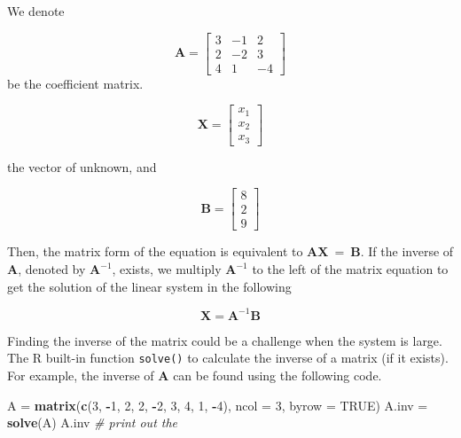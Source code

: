 \documentclass[
]{book}
\newenvironment{Shaded}{\begin{snugshade}}{\end{snugshade}}
\newcommand{\AttributeTok}[1]{\textcolor[rgb]{0.13,0.29,0.53}{#1}}
\newcommand{\CommentTok}[1]{\textcolor[rgb]{0.56,0.35,0.01}{\textit{#1}}}
\newcommand{\ConstantTok}[1]{\textcolor[rgb]{0.56,0.35,0.01}{#1}}
\newcommand{\DecValTok}[1]{\textcolor[rgb]{0.00,0.00,0.81}{#1}}
\newcommand{\FunctionTok}[1]{\textcolor[rgb]{0.13,0.29,0.53}{\textbf{#1}}}
\newcommand{\NormalTok}[1]{#1}
\newcommand{\OtherTok}[1]{\textcolor[rgb]{0.56,0.35,0.01}{#1}}
\newcommand{\SpecialCharTok}[1]{\textcolor[rgb]{0.81,0.36,0.00}{\textbf{#1}}}
\begin{document}
We denote

\[
\mathbf{A} = \left[
\begin{array}{ccc}
 3 & -1 &  2 \\ 
 2 & -2 &  3 \\ 
 4 &  1 & -4 
\end{array}
\right]
\]
be the coefficient matrix.

\[
\mathbf{X} = \left[ \begin{array}{c} x_1 \\ x_2 \\ x_3  \end{array} \right]
\]

the vector of unknown, and

\[
\mathbf{B} = \left[ \begin{array}{c} 8 \\ 2 \\ 9  \end{array} \right]
\]

Then, the matrix form of the equation is equivalent to \(\mathbf{A}\mathbf{X} ~=~ \mathbf{B}\). If the inverse of \(\mathbf{A}\), denoted by \(\mathbf{A}^{-1}\), exists, we multiply \(\mathbf{A}^{-1}\) to the left of the matrix equation to get the solution of the linear system in the following

\[
\mathbf{X} = \mathbf{A}^{-1}\mathbf{B}
\]

Finding the inverse of the matrix could be a challenge when the system is large. The R built-in function \texttt{solve()} to calculate the inverse of a matrix (if it exists).
For example, the inverse of \(\mathbf{A}\) can be found using the following code.

\begin{Shaded}
\begin{Highlighting}[]
\NormalTok{A }\OtherTok{=} \FunctionTok{matrix}\NormalTok{(}\FunctionTok{c}\NormalTok{(}\DecValTok{3}\NormalTok{, }\SpecialCharTok{{-}}\DecValTok{1}\NormalTok{, }\DecValTok{2}\NormalTok{, }\DecValTok{2}\NormalTok{, }\SpecialCharTok{{-}}\DecValTok{2}\NormalTok{, }\DecValTok{3}\NormalTok{, }\DecValTok{4}\NormalTok{, }\DecValTok{1}\NormalTok{, }\SpecialCharTok{{-}}\DecValTok{4}\NormalTok{), }\AttributeTok{ncol =} \DecValTok{3}\NormalTok{, }\AttributeTok{byrow =} \ConstantTok{TRUE}\NormalTok{)}
\NormalTok{A.inv }\OtherTok{=} \FunctionTok{solve}\NormalTok{(A)}
\NormalTok{A.inv        }\CommentTok{\# print out the }
\end{Highlighting}
\end{Shaded}
\end{document}
